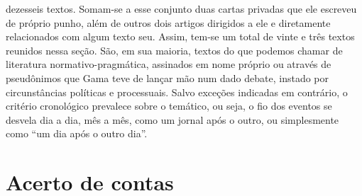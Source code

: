 \begin{argumento}
{dezesseis textos. Somam-se a esse conjunto duas cartas privadas que ele
escreveu de próprio punho, além de outros dois artigos dirigidos a ele e
diretamente relacionados com algum texto seu. Assim, tem-se um total de
vinte e três textos reunidos nessa seção. São, em sua maioria, textos do
que podemos chamar de literatura normativo-pragmática, assinados em nome
próprio ou através de pseudônimos que Gama teve de lançar mão num dado
debate, instado por circunstâncias políticas e processuais. Salvo
exceções indicadas em contrário, o critério cronológico prevalece sobre
o temático, ou seja, o fio dos eventos se desvela dia a dia, mês a mês,
como um jornal após o outro, ou simplesmente como ``um dia após o outro
dia''.}
\end{argumento}

\part{Acerto de contas}

